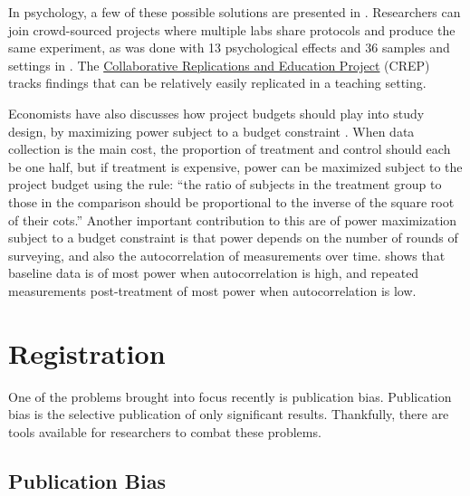 \documentclass[12pt] {article}
\begin{document}
In psychology, a few of these possible solutions are presented in \cite{openmaximizing}. Researchers can join crowd-sourced projects where multiple labs share protocols and produce the same experiment, as was done with 13 psychological effects and 36 samples and settings in \cite{many_labs}. The \href{https://osf.io/wfc6u/}{Collaborative Replications and Education Project} (CREP) tracks findings that can be relatively easily replicated in a teaching setting. 

Economists have also discusses how project budgets should play into study design, by maximizing power subject to a budget constraint \cite{randomizationtoolkit}. When data collection is the main cost, the proportion of treatment and control should each be one half, but if treatment is expensive, power can be maximized subject to the project budget using the rule: ``the ratio of subjects in the treatment group to those in the comparison should be proportional to the inverse of the square root of their cots.''  Another important contribution to this are of power maximization subject to a budget constraint is that power depends on the number of rounds of surveying, and also the autocorrelation of measurements over time. \cite{mckenzie2012caseformoreT} shows that baseline data is of most power when autocorrelation is high, and repeated measurements post-treatment of most power when autocorrelation is low.





\section{Registration}\label{registration}

One of the problems brought into focus recently is publication bias.
Publication bias is the selective publication of only significant
results. Thankfully, there are tools available for researchers to combat
these problems.

\subsection{Publication Bias}\label{publication-bias}
\end{document}
